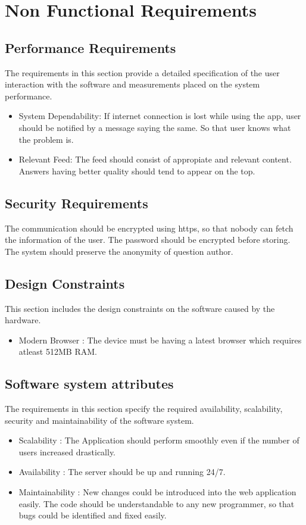 \documentclass[12pt]{article}
\begin{document}
\section{Non Functional Requirements}


\subsection{Performance Requirements}
The requirements in this section provide a detailed specification of the user interaction with the software and measurements placed on the system performance.
\begin{itemize}
\item System Dependability: If internet connection is lost while using the app, user should be notified by a message saying the same. So that user knows what the problem is.
\item Relevant Feed: The feed should consist of appropiate and relevant content. Answers having better quality should tend to appear on the top.
\end{itemize}

\subsection{Security Requirements}
The communication should be encrypted using https, so that nobody can fetch the information of the user. The password should be encrypted before storing. The system should preserve the anonymity of question author.

\subsection{Design Constraints}
This section includes the design constraints on the software caused by the hardware.
\begin{itemize}
\item Modern Browser : The device must be having a latest browser which requires atleast 512MB RAM.
\end{itemize}

\subsection{Software system attributes}
The requirements in this section specify the required availability, scalability, security and maintainability of the software system.
\begin{itemize}
\item Scalability : The Application should perform smoothly even if the number of users increased drastically.
\item Availability : The server should be up and running 24/7.
\item Maintainability : New changes could be introduced into the web application easily. The code should be understandable to any new programmer, so that bugs could be identified and fixed easily.
\end{itemize}
\end{document}

